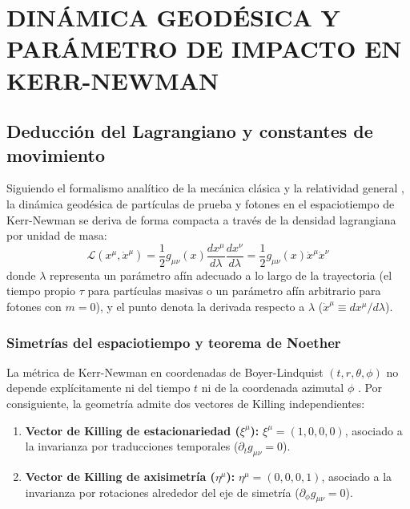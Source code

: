 \chapter{DINÁMICA GEODÉSICA Y PARÁMETRO DE IMPACTO EN KERR-NEWMAN}


\section{Deducción del Lagrangiano y constantes de movimiento}

Siguiendo el formalismo analítico de la mecánica clásica y la relatividad general \citep{05villegas, M_P_Hobson_General_Relativity, Sean_Carroll_Spacetime}, la dinámica geodésica de partículas de prueba y fotones en el espaciotiempo de Kerr-Newman se deriva de forma compacta a través de la densidad lagrangiana por unidad de masa:
\begin{equation}
    \mathcal{L}(x^\mu, \dot{x}^\mu) = \frac{1}{2} g_{\mu\nu}(x) \frac{dx^\mu}{d\lambda} \frac{dx^\nu}{d\lambda} = \frac{1}{2} g_{\mu\nu}(x) \dot{x}^\mu \dot{x}^\nu
    \label{eq:lagrangiano_gen}
\end{equation}
donde $\lambda$ representa un parámetro afín adecuado a lo largo de la trayectoria (el tiempo propio $\tau$ para partículas masivas o un parámetro afín arbitrario para fotones con $m=0$), y el punto denota la derivada respecto a $\lambda$ ($\dot{x}^\mu \equiv dx^\mu/d\lambda$).

\subsection{Simetrías del espaciotiempo y teorema de Noether}

La métrica de Kerr-Newman en coordenadas de Boyer-Lindquist $(t, r, \theta, \phi)$ no depende explícitamente ni del tiempo $t$ ni de la coordenada azimutal $\phi$ \citep{1403.5234v2, pdfcoffee.com_chandrasekhar}. Por consiguiente, la geometría admite dos vectores de Killing independientes:
\begin{enumerate}
    \item \textbf{Vector de Killing de estacionariedad ($\xi^\mu$):} $\xi^\mu = (1, 0, 0, 0)$, asociado a la invarianza por traducciones temporales ($\partial_t g_{\mu\nu} = 0$).
    \item \textbf{Vector de Killing de axisimetría ($\eta^\mu$):} $\eta^\mu = (0, 0, 0, 1)$, asociado a la invarianza por rotaciones alrededor del eje de simetría ($\partial_\phi g_{\mu\nu} = 0$).
\end{enumerate}

